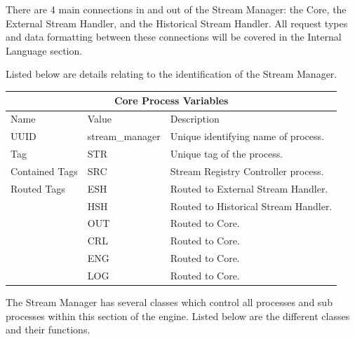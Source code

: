 \documentclass{article}
\begin{document}
There are 4 main connections in and out of the Stream Manager: the Core, the External Stream Handler, and the Historical Stream Handler. All request types and data formatting between these connections will be covered in the Internal Language section.

Listed below are details relating to the identification of the Stream Manager.

\begin{center}
\begin{tabular}{ | p{5cm} || p{4cm} | p{6cm} | }
\hline
\multicolumn{3}{|c|}{Core Process Variables}\\
\hline
Name & Value & Description\\
\hline
UUID & stream\_manager & Unique identifying name of process.\\
\hline
Tag & STR & Unique tag of the process.\\
\hline
Contained Tags & SRC & Stream Registry Controller process.\\
\hline
Routed Tags & ESH & Routed to External Stream Handler.\\
 & HSH & Routed to Historical Stream Handler.\\
 & OUT & Routed to Core.\\
 & CRL & Routed to Core.\\
 & ENG & Routed to Core.\\
 & LOG & Routed to Core.\\
\hline
\end{tabular}
\end{center}

The Stream Manager has several classes which control all processes and sub processes within this section of the engine. Listed below are the different classes and their functions.
\end{document}
